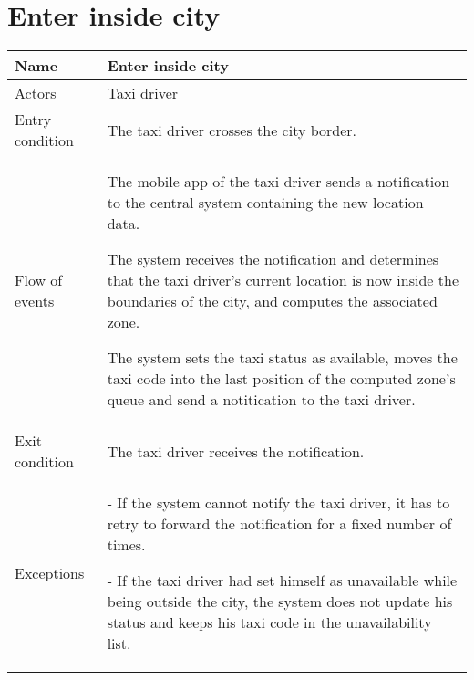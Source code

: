 \section{Enter inside city}
\begin{center}
\begin{longtable}{|l| p{9cm}|}
\hline
Name &
Enter inside city \\
\hline
Actors &
Taxi driver \\
\hline
Entry condition & 
The taxi driver crosses the city border. \\
\hline
Flow of events & 
The mobile app of the taxi driver sends a notification to the central system containing the new location data. 

The system receives the notification and determines that the taxi driver's current location is now inside the boundaries of the city, and computes the associated zone.

The system sets the taxi status as available, moves the taxi code into the last position of the computed zone’s queue and send a notitication to the taxi driver. \\
\hline
Exit condition &
The taxi driver receives the notification. \\
\hline
Exceptions &
- If the system cannot notify the taxi driver, it has to retry to forward the notification for a fixed number of times.

- If the taxi driver had set himself as unavailable while being outside the city, the system does not update his status and keeps his taxi code in the unavailability list.\\
\hline
\end{longtable}
\end{center}